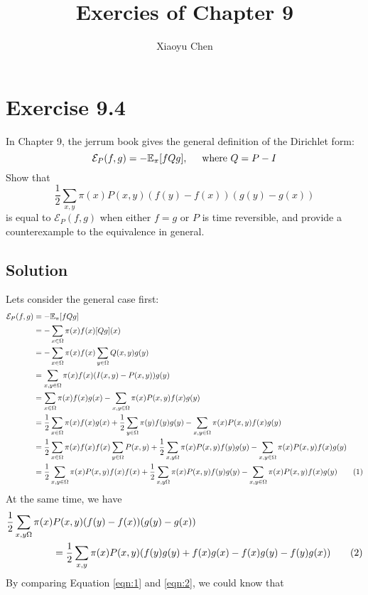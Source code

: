 \documentclass{article}
\title{Exercies of Chapter 9}
\author{Xiaoyu Chen}
\date{}
\newcommand\numberthis{\addtocounter{equation}{1}\tag{\theequation}}
\begin{document}
\maketitle
\section{Exercise 9.4}
In Chapter 9, the jerrum book gives the general definition of the Dirichlet form:
\[\mathcal{E}_P(f, g) = -\mathbb{E}_\pi[fQg], \hspace{0.5cm} \mbox{where }Q = P - I\]
Show that
\[\frac{1}{2}\sum_{x, y} \pi(x)P(x,y)(f(y) - f(x))(g(y) - g(x))\]
is equal to $\mathcal{E}_P(f, g)$ when either $f = g$ or $P$ is time reversible,
and provide a counterexample to the equivalence in general.
\subsection{Solution}
Lets consider the general case first:
\begin{align*}
  \mathcal{E}_P(f, g) &= -\mathbb{E}_\pi [fQg] \\
  &= -\sum_{x\in\Omega} \pi(x)f(x)[Qg](x) \\
  &= -\sum_{x\in\Omega} \pi(x)f(x)\sum_{y\in\Omega}Q(x, y)g(y) \\
  &= \sum_{x, y\in\Omega} \pi(x) f(x)(I(x, y) - P(x, y)) g(y) \\
  &= \sum_{x\in\Omega} \pi(x) f(x)g(x) - \sum_{x, y\in\Omega} \pi(x)P(x, y)f(x)g(y) \\
  &= \frac{1}{2}\sum_{x\in\Omega} \pi(x)f(x)g(x) + \frac{1}{2}\sum_{y\in\Omega} \pi(y)f(y)g(y) - \sum_{x,y\in\Omega} \pi(x)P(x, y) f(x)g(y)\\
  &= \frac{1}{2}\sum_{x\in\Omega}\pi(x)f(x)f(x)\sum_{y\in\Omega}P(x,y) + \frac{1}{2}\sum_{x, y\Omega} \pi(x)P(x,y)f(y)g(y) - \sum_{x,y\in\Omega}\pi(x)P(x,y)f(x)g(y) \\
  &= \frac{1}{2}\sum_{x,y\in\Omega}\pi(x)P(x,y)f(x)f(x) + \frac{1}{2}\sum_{x, y\Omega} \pi(x)P(x,y)f(y)g(y) - \sum_{x,y\in\Omega}\pi(x)P(x,y)f(x)g(y) \numberthis \label{eqn:1}
\end{align*}
At the same time, we have
\begin{align*}
  \frac{1}{2}\sum_{x,y\Omega}\pi(x)&P(x,y)(f(y) - f(x))(g(y) - g(x)) \\
  &= \frac{1}{2}\sum_{x,y} \pi(x)P(x, y) (f(y)g(y) + f(x)g(x) - f(x)g(y) - f(y)g(x)) \numberthis \label{eqn:2}
\end{align*}
By comparing Equation \eqref{eqn:1} and \eqref{eqn:2}, we could know that
\end{document}
